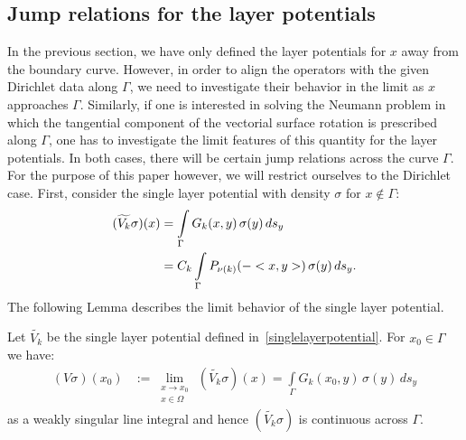 \subsection{Jump relations for the layer potentials} 
In the previous section, we have only defined the layer potentials for
$x$ away from the boundary curve. However, in order to align the
operators with the given Dirichlet data along $\Gamma$, we need to
investigate their behavior in the limit as $x$ approaches $\Gamma$.
Similarly, if one is interested in solving the Neumann problem in which
the tangential component of the vectorial surface rotation is prescribed
along $\Gamma$, one has to investigate the limit features of this
quantity for the layer potentials. In both cases, there will be certain
jump relations across the curve $\Gamma$. For the purpose of this paper
however, we will restrict ourselves to the Dirichlet case.  First,
consider the single layer potential with density $\sigma$ for $x \notin
\Gamma$:
\begin{align*}
  (\widetilde{V_k}\sigma)(x) & =  \int\limits_\Gamma
  G_k(x,y)\,\sigma(y)\,ds_{y} \\
  & = C_k \int\limits_\Gamma P_{\nu(k)}(-<x,y>)\,\sigma(y)\,ds_{y}.
\end{align*}
The following Lemma describes the limit behavior of the single layer
potential.  \begin{lemma} Let $\widetilde{V_k}$ be the single layer
potential defined in~\eqref{singlelayerpotential}. For $x_{0}\in\Gamma$
we have:
\begin{align*} 
  (V\sigma)(x_0) & := \lim\limits_{\substack{
      x \to x_{0} \\ x \in \Omega}}
  \,(\widetilde{V_k}\sigma)(x) = \int\limits_\Gamma G_k(x_{0},y)\,\sigma(y)\,ds_{y}
\end{align*}
as a weakly singular line integral and hence $(\widetilde{V_k}\sigma)$
is continuous across $\Gamma$.
\end{lemma}
